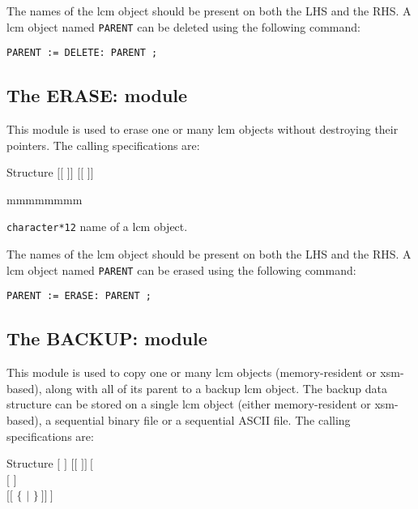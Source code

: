The names of the {\sc lcm} object should be present on both the LHS and
the RHS. A {\sc lcm} object named {\tt PARENT} can be deleted using the following command:

\begin{verbatim}
PARENT := DELETE: PARENT ;
\end{verbatim}

\subsection{The ERASE: module}\label{sect:ERASEData}

This module is used to erase one or many {\sc lcm} objects without destroying their pointers. The calling
specifications are:

\begin{DataStructure}{Structure }
$[[$  $]]$ \moc{:=}  $[[$  $]]$ \moc{;}
\end{DataStructure}

\begin{ListeDeDescription}{mmmmmmmm}

\item[\dusa{NAME1}] {\tt character*12} name of a {\sc lcm} object.

\end{ListeDeDescription}

The names of the {\sc lcm} object should be present on both the LHS and
the RHS. A {\sc lcm} object named {\tt PARENT} can be erased using the following command:

\begin{verbatim}
PARENT := ERASE: PARENT ;
\end{verbatim}

\clearpage

\subsection{The BACKUP: module}\label{sect:BACKUPData}

This module is used to copy one or many {\sc lcm} objects (memory-resident or {\sc xsm}-based), along with all of its parent to a backup {\sc lcm} object. The backup data
structure can be stored on a single {\sc lcm} object (either memory-resident or {\sc xsm}-based), a sequential binary
file or a sequential ASCII file. The calling specifications are:

\begin{DataStructure}{Structure }
 \moc{:=}  $[$  $]$ $[[$  $]]~[$ \moc{::} \\
 $[$   $]$ \\
 $[[$  $\{$   $|$   $\}~]]~]$ \moc{;}
\end{DataStructure}

